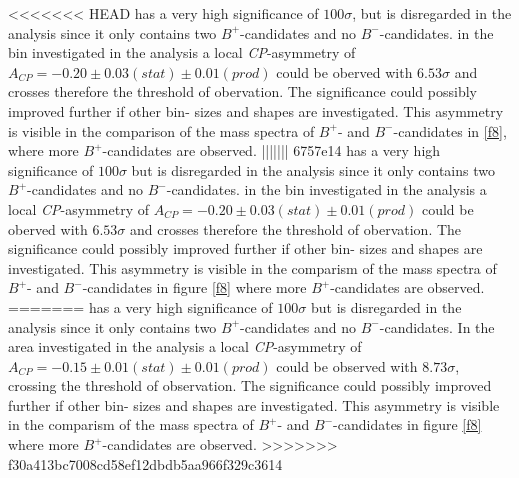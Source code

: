 <<<<<<< HEAD
has a very high significance of $100 \sigma$, but is disregarded in the analysis since it only contains two $B^+$-candidates and no $B^-$-candidates.
in the bin investigated in the analysis a local \textit{CP}-asymmetry of $A_\textit{CP} = -0.20 \pm 0.03(stat)  \pm 0.01(prod)$ could be oberved 
with $6.53 \sigma$ and crosses therefore the threshold of obervation. The significance could possibly improved further if other bin- sizes and shapes are
investigated. This asymmetry is visible in the comparison of the mass spectra of $B^+$- and $B^-$-candidates in \autoref{f8}, where more
$B^+$-candidates are observed.
||||||| 6757e14
has a very high significance of $100 \sigma$ but is disregarded in the analysis since it only contains two $B^+$-candidates and no $B^-$-candidates. 
in the bin investigated in the analysis a local \textit{CP}-asymmetry of $A_\textit{CP} = -0.20 \pm 0.03(stat)  \pm 0.01(prod)$ could be oberved 
with $6.53 \sigma$ and crosses therefore the threshold of obervation. The significance could possibly improved further if other bin- sizes and shapes are 
investigated. This asymmetry is visible in the comparism of the mass spectra of $B^+$- and $B^-$-candidates in figure \ref{f8} where more 
$B^+$-candidates are observed.
=======
has a very high significance of $100 \sigma$ but is disregarded in the analysis since it only contains two $B^+$-candidates and no $B^-$-candidates. 
In the area investigated in the analysis a local \textit{CP}-asymmetry of $A_\textit{CP} = -0.15  \pm 0.01  (stat)  \pm 0.01(prod)$ could be observed 
with $8.73 \sigma$, crossing the threshold of observation. The significance could possibly improved further if other bin- sizes and shapes are 
investigated. This asymmetry is visible in the comparism of the mass spectra of $B^+$- and $B^-$-candidates in figure \ref{f8} where more 
$B^+$-candidates are observed.
>>>>>>> f30a413bc7008cd58ef12dbdb5aa966f329c3614
